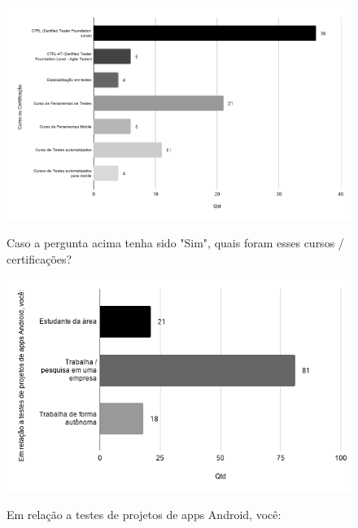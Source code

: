     
        \begin{figure}[!htb]
        \centering
        \includegraphics[width=.80\textwidth]{images/s_certificacaodesc.png}
        \label{figure:s_certificacaodesc}
        \caption{Caso a pergunta acima tenha sido "Sim", quais foram esses cursos / certificações?}
        \end{figure}
    
    
        \begin{figure}[!htb]
        \centering
        \includegraphics[width=.80\textwidth]{images/s_projetos.png}
        \label{figure:s_projetos}
        \caption{Em relação a testes de projetos de apps Android, você:}
        \end{figure}
    
